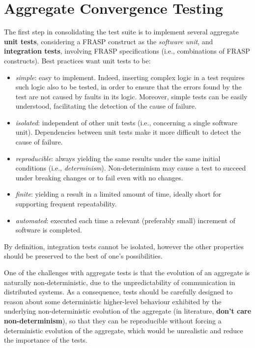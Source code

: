 
\section{Aggregate Convergence Testing}
\label{section:analysis:aggregate-convergence-testing}

The first step in consolidating the test suite is to implement several
aggregate \textbf{unit tests}, considering a FRASP construct as the
\textit{software unit}, and \textbf{integration tests}, involving FRASP
specifications (i.e., combinations of FRASP constructs). Best practices
\cite{UnitTesting} want unit tests to be:
\begin{itemize}
  \item \textit{simple}: easy to implement. Indeed, inserting complex logic in
        a test requires such logic also to be tested, in order to ensure that
        the errors found by the test are not caused by faults in its logic.
        Moreover, simple tests can be easily understood, facilitating the
        detection of the cause of failure.
  \item \textit{isolated}: independent of other unit tests (i.e., concerning
        a single software unit). Dependencies between unit tests make it more
        difficult to detect the cause of failure.
  \item \textit{reproducible}: always yielding the same results under the same
        initial conditions (i.e., \textit{determinism}). Non-determinism may
        cause a test to succeed under breaking changes or to fail even with
        no changes.
  \item \textit{finite}: yielding a result in a limited amount of time, ideally
        short for supporting frequent repeatability.
  \item \textit{automated}: executed each time a relevant (preferably small)
        increment of software is completed.
\end{itemize}

By definition, integration tests cannot be isolated, however the other
properties should be preserved to the best of one's possibilities.

One of the challenges with aggregate tests is that the evolution of an
aggregate is naturally non-deterministic, due to the unpredictability of
communication in distributed systems. As a consequence, tests should be
carefully designed to reason about some deterministic higher-level behaviour
exhibited by the underlying non-deterministic evolution of the aggregate (in
literature, \textbf{don't care non-determinism}), so that they can be
reproducible without forcing a deterministic evolution of the aggregate, which
would be unrealistic and reduce the importance of the tests.

